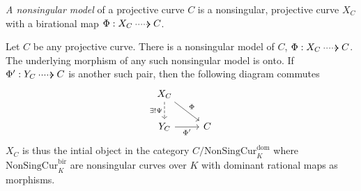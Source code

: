     \begin{definition}
        \emph{A nonsingular model} of a projective curve $C$ is a nonsingular, projective curve $X_C$ with a birational map $\Phi:X_C\dottedarrow C$.   
    \end{definition}
    \begin{theorem}
        Let $C$ be any projective curve. There is a nonsingular model of $C$, $\Phi : X_C \dottedarrow C$. The underlying morphism of any such nonsingular model is onto. If $\Phi' : Y_C \dottedarrow C$ is another such pair, then the following diagram commutes
        $$
            \begin{tikzcd}
                X_C\arrow[d, dashrightarrow,"\exists!\Psi"'] \arrow[rd,"\Phi"]\\
                Y_C \arrow[r,"\Phi'"'] & C
            \end{tikzcd}
        $$
        $X_C$ is thus the intial object in the category $C/\mathrm{NonSingCur}^\mathrm{dom}_K$ where $\mathrm{NonSingCur}^\mathrm{bir}_K$ are nonsingular curves over $K$ with dominant rational maps as morphisms. 
    \end{theorem}
